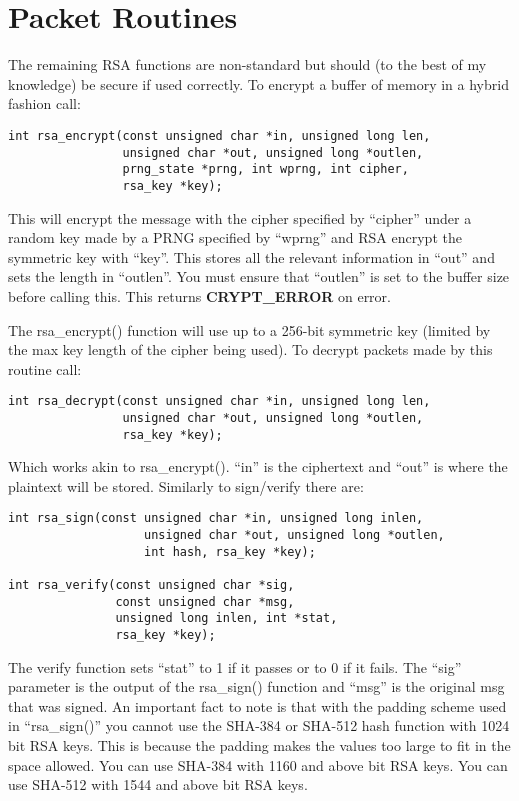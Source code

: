 \documentclass{book}
\begin{document}
\section{Packet Routines}
The remaining RSA functions are non-standard but should (to the best of my knowledge) be secure if used correctly.  To
encrypt a buffer of memory in a hybrid fashion call:
\begin{verbatim}
int rsa_encrypt(const unsigned char *in, unsigned long len, 
                unsigned char *out, unsigned long *outlen,
                prng_state *prng, int wprng, int cipher, 
                rsa_key *key);
\end{verbatim}
This will encrypt the message with the cipher specified by ``cipher'' under a random key made by a PRNG specified by
``wprng'' and RSA encrypt the symmetric key with ``key''.  This stores all the relevant information in ``out'' and sets
the length in ``outlen''.  You must ensure that ``outlen'' is set to the buffer size before calling this.  This returns
{\bf CRYPT\_ERROR} on error.  

The rsa\_encrypt() function will use up to a 256-bit symmetric key (limited by the max key length of the cipher being
used).  To decrypt packets made by this routine call:
\begin{verbatim}
int rsa_decrypt(const unsigned char *in, unsigned long len, 
                unsigned char *out, unsigned long *outlen, 
                rsa_key *key);
\end{verbatim}
Which works akin to rsa\_encrypt().  ``in'' is the ciphertext and ``out'' is where the plaintext will be stored.  Similarly
to sign/verify there are:
 
\begin{verbatim}
int rsa_sign(const unsigned char *in, unsigned long inlen, 
                   unsigned char *out, unsigned long *outlen, 
                   int hash, rsa_key *key);

int rsa_verify(const unsigned char *sig,
               const unsigned char *msg, 
               unsigned long inlen, int *stat, 
               rsa_key *key);
\end{verbatim}

The verify function sets ``stat'' to 1 if it passes or to 0 if it fails.  The ``sig'' parameter is the output of the
rsa\_sign() function and ``msg'' is the original msg that was signed.  An important fact to note is that with
the padding scheme used in ``rsa\_sign()'' you cannot use the SHA-384 or SHA-512 hash function with 1024 bit
RSA keys.  This is because the padding makes the values too large to fit in the space allowed.  You can use SHA-384
with 1160 and above bit RSA keys.  You can use SHA-512 with 1544 and above bit RSA keys.
\end{document}

